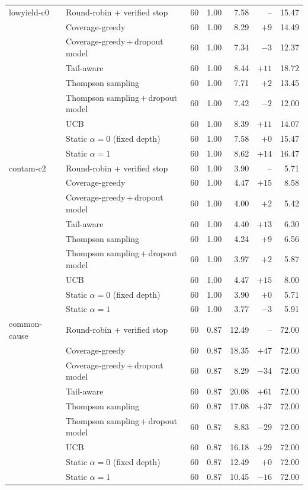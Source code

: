\begin{table}[!t]
\begin{tabular}{@{}llrrrrr@{}}
\midrule
lowyield-c0 & Round-robin + verified stop & 60 & 1.00 & 7.58 & -- & 15.47 \\
 & Coverage-greedy & 60 & 1.00 & 8.29 & $+9$ & 14.49 \\
 & Coverage-greedy\,+\,dropout model & 60 & 1.00 & 7.34 & $-3$ & 12.37 \\
 & Tail-aware & 60 & 1.00 & 8.44 & $+11$ & 18.72 \\
 & Thompson sampling & 60 & 1.00 & 7.71 & $+2$ & 13.45 \\
 & Thompson sampling\,+\,dropout model & 60 & 1.00 & 7.42 & $-2$ & 12.00 \\
 & UCB & 60 & 1.00 & 8.39 & $+11$ & 14.07 \\
 & Static $\alpha{=}0$ (fixed depth) & 60 & 1.00 & 7.58 & $+0$ & 15.47 \\
 & Static $\alpha{=}1$ & 60 & 1.00 & 8.62 & $+14$ & 16.47 \\
\midrule
contam-c2 & Round-robin + verified stop & 60 & 1.00 & 3.90 & -- & 5.71 \\
 & Coverage-greedy & 60 & 1.00 & 4.47 & $+15$ & 8.58 \\
 & Coverage-greedy\,+\,dropout model & 60 & 1.00 & 4.00 & $+2$ & 5.42 \\
 & Tail-aware & 60 & 1.00 & 4.40 & $+13$ & 6.30 \\
 & Thompson sampling & 60 & 1.00 & 4.24 & $+9$ & 6.56 \\
 & Thompson sampling\,+\,dropout model & 60 & 1.00 & 3.97 & $+2$ & 5.87 \\
 & UCB & 60 & 1.00 & 4.47 & $+15$ & 8.00 \\
 & Static $\alpha{=}0$ (fixed depth) & 60 & 1.00 & 3.90 & $+0$ & 5.71 \\
 & Static $\alpha{=}1$ & 60 & 1.00 & 3.77 & $-3$ & 5.91 \\
\midrule
common-cause & Round-robin + verified stop & 60 & 0.87 & 12.49 & -- & 72.00 \\
 & Coverage-greedy & 60 & 0.87 & 18.35 & $+47$ & 72.00 \\
 & Coverage-greedy\,+\,dropout model & 60 & 0.87 & 8.29 & $-34$ & 72.00 \\
 & Tail-aware & 60 & 0.87 & 20.08 & $+61$ & 72.00 \\
 & Thompson sampling & 60 & 0.87 & 17.08 & $+37$ & 72.00 \\
 & Thompson sampling\,+\,dropout model & 60 & 0.87 & 8.83 & $-29$ & 72.00 \\
 & UCB & 60 & 0.87 & 16.18 & $+29$ & 72.00 \\
 & Static $\alpha{=}0$ (fixed depth) & 60 & 0.87 & 12.49 & $+0$ & 72.00 \\
 & Static $\alpha{=}1$ & 60 & 0.87 & 10.45 & $-16$ & 72.00 \\
\bottomrule
\end{tabular}
\end{table}
